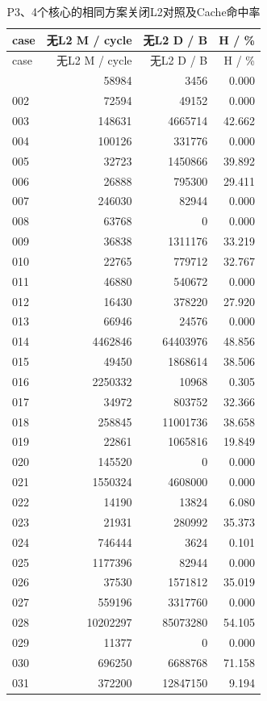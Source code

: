 \documentclass[anonymous,notoc]{gmcm2026}
\begin{document}
\begin{longtable}{lrrr}
\caption{P3、4个核心的相同方案关闭L2对照及Cache命中率}\\
\toprule
case & 无L2 M / cycle & 无L2 D / B & H / \%\\\midrule
\endfirsthead
\toprule
case & 无L2 M / cycle & 无L2 D / B & H / \%\\\midrule
\endhead
\bottomrule\endfoot
001 & 58984 & 3456 & 0.000 \\
002 & 72594 & 49152 & 0.000 \\
003 & 148631 & 4665714 & 42.662 \\
004 & 100126 & 331776 & 0.000 \\
005 & 32723 & 1450866 & 39.892 \\
006 & 26888 & 795300 & 29.411 \\
007 & 246030 & 82944 & 0.000 \\
008 & 63768 & 0 & 0.000 \\
009 & 36838 & 1311176 & 33.219 \\
010 & 22765 & 779712 & 32.767 \\
011 & 46880 & 540672 & 0.000 \\
012 & 16430 & 378220 & 27.920 \\
013 & 66946 & 24576 & 0.000 \\
014 & 4462846 & 64403976 & 48.856 \\
015 & 49450 & 1868614 & 38.506 \\
016 & 2250332 & 10968 & 0.305 \\
017 & 34972 & 803752 & 32.366 \\
018 & 258845 & 11001736 & 38.658 \\
019 & 22861 & 1065816 & 19.849 \\
020 & 145520 & 0 & 0.000 \\
021 & 1550324 & 4608000 & 0.000 \\
022 & 14190 & 13824 & 6.080 \\
023 & 21931 & 280992 & 35.373 \\
024 & 746444 & 3624 & 0.101 \\
025 & 1177396 & 82944 & 0.000 \\
026 & 37530 & 1571812 & 35.019 \\
027 & 559196 & 3317760 & 0.000 \\
028 & 10202297 & 85073280 & 54.105 \\
029 & 11377 & 0 & 0.000 \\
030 & 696250 & 6688768 & 71.158 \\
031 & 372200 & 12847150 & 9.194 \\

\end{longtable}
\end{document}
